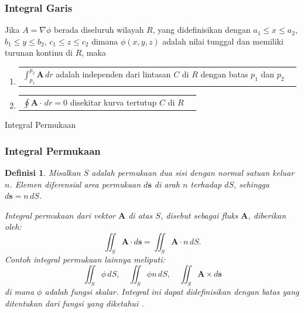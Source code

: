 \documentclass[10pt]{beamer}
\newtheorem{definisi}{Definisi}
\begin{document}
\begin{frame}
    \frametitle{Integral Garis}
    \justifying
    \begin{theorem}
    Jika $A = \nabla \phi$ berada diseluruh wilayah $R$, yang didefinisikan dengan $a_{1} \leq x \leq a_{2}$, $b_{1} \leq y \leq b_{2}$, $c_{1} \leq z \leq c_{2}$ dimana $\phi(x,y,z)$ adalah nilai tunggal dan memiliki turunan kontinu di $R$, maka
        \begin{enumerate}
            \item \begin{tabularx}{\linewidth}{@{}>{\raggedright\arraybackslash}X>{\raggedleft\arraybackslash}X@{}}
                $\int_{p_{1}}^{p_{2}} \mathbf{A}\, dr$ adalah independen dari lintasan $C$ di $R$ dengan batas $p_{1}$ dan $p_{2}$  \\
            \end{tabularx}
            \item \begin{tabularx}{\linewidth}{@{}>{\raggedright\arraybackslash}X>{\raggedleft\arraybackslash}X@{}}
                $\oint \mathbf{A} \cdot\, dr = 0$ disekitar kurva tertutup $C$ di $R$ \\
            \end{tabularx}
        \end{enumerate}
    \end{theorem}
\end{frame}

\begin{frame}{Integral Permukaan}
    \frametitle{Integral Permukaan}
    \justifying
    \begin{definisi}
        Misalkan $S$ adalah permukaan dua sisi dengan normal satuan keluar $n$. Elemen diferensial area permukaan $d\mathbf{s}$ di arah $n$ terhadap $dS$, sehingga $d\mathbf{s} = n\, dS$.

Integral permukaan dari vektor $\mathbf{A}$ di atas $S$, disebut sebagai fluks $\mathbf{A}$, diberikan oleh:
\[
\iint_S \mathbf{A} \cdot d\mathbf{s} = \iint_S \mathbf{A} \cdot n\, dS.
\]
Contoh integral permukaan lainnya meliputi:
\[
\iint_S \phi\, dS, \quad \iint_S \phi n\, dS, \quad \iint_S \mathbf{A} \times d\mathbf{s}
\]
di mana $\phi$ adalah fungsi skalar. Integral ini dapat didefinisikan dengan batas yang ditentukan dari fungsi yang diketahui .

\end{definisi}
\end{frame}
\end{document}

